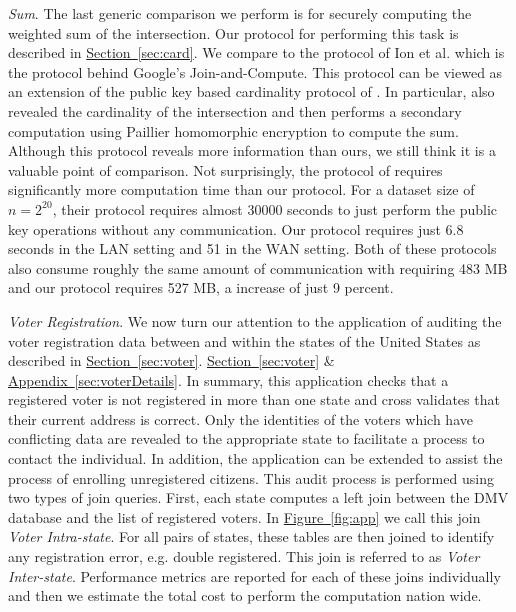 \documentclass[11pt,letterpaper]{article}
\newcommand{\namedref}[2]{\hyperref[#2]{#1~\ref*{#2}}}
\newcommand{\sectionref}[1]{\namedref{Section}{#1}}
\newcommand{\figureref}[1]{\namedref{Figure}{#1}}
\newcommand{\appendixref}[1]{\namedref{Appendix}{#1}}
\renewcommand{\paragraph}[1]{\vspace{0.1cm}\noindent\emph{#1}.}
\begin{document}
\paragraph{Sum} The last generic comparison we perform is for securely computing the weighted sum of the intersection. Our protocol for performing this task is described in \sectionref{sec:card}. We compare to the protocol of Ion et al. \cite{cryptoeprint:2017:738} which is the protocol behind Google's Join-and-Compute. This protocol can be viewed as an extension of the public key based cardinality protocol of \cite{DBLP:conf/cans/CristofaroGT12}. In particular, \cite{cryptoeprint:2017:738}  also revealed the cardinality of the intersection and then performs a secondary computation using Paillier homomorphic encryption to compute the sum. Although this protocol reveals more information than ours, we still think it is a valuable point of comparison. Not surprisingly,  the protocol of \cite{cryptoeprint:2017:738} requires significantly more computation time than our protocol. For a dataset size of $n=2^{20}$, their protocol requires almost 30000 seconds to just perform the public key operations without any communication. Our protocol requires just 6.8 seconds in the LAN setting and 51 in the WAN setting. Both of these protocols also consume roughly the same amount of communication with \cite{cryptoeprint:2017:738} requiring 483 MB and our protocol requires 527 MB, a increase of just 9 percent. 

\paragraph{Voter Registration} We now turn our attention to the application of auditing the voter registration data between and within the states of the United States as described in 
\iffullversion
\sectionref{sec:voter}.
\else
\sectionref{sec:voter} \& \appendixref{sec:voterDetails}. 
\fi
In summary, this application checks that a registered voter is not registered in more than one state and cross validates that their current address is correct. Only the identities of the voters which have conflicting data are revealed to the appropriate state to facilitate a process to contact the individual. In addition, the application can be extended to assist the process of enrolling unregistered citizens. This audit process is performed using two types of join queries. First, each state computes a left join between the DMV database and the list of registered voters. In \figureref{fig:app} we call this join \emph{Voter Intra-state}. For all pairs of states, these tables are then joined to identify any registration error, e.g. double registered. This join is referred to as \emph{Voter Inter-state}. Performance metrics are reported for each of these joins individually and then we estimate the total cost to perform the computation nation wide. 
\end{document}
